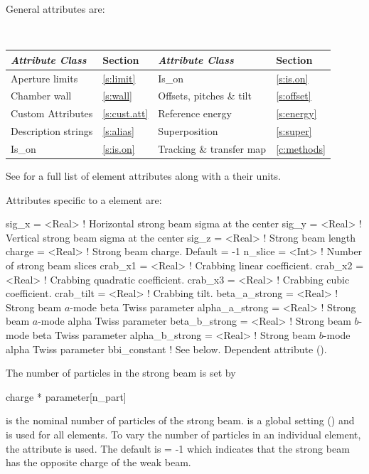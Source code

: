 General  attributes are:
\begin{center} 
\tt
\begin{tabular}{llll} \toprule
  {\sl Attribute Class}      & Section          & {\sl Attribute Class}      & Section         \\ \midrule
  Aperture limits            & \ref{s:limit}    & Is_on                      & \ref{s:is.on}   \\
  Chamber wall               & \ref{s:wall}     & Offsets, pitches \& tilt   & \ref{s:offset}  \\
  Custom Attributes          & \ref{s:cust.att} & Reference energy           & \ref{s:energy}  \\
  Description strings        & \ref{s:alias}    & Superposition              & \ref{s:super}   \\
  Is_on                      & \ref{s:is.on}    & Tracking \& transfer map   & \ref{c:methods} \\ 
  \bottomrule
\end{tabular}
\end{center}
\toffset
See  for a full list of element attributes along with a their units.

Attributes specific to a  element are:
\begin{example}
  sig_x          = <Real> ! Horizontal strong beam sigma at the center 
  sig_y          = <Real> ! Vertical strong beam sigma at the center
  sig_z          = <Real> ! Strong beam length
  charge         = <Real> ! Strong beam charge. Default = -1
  n_slice        = <Int>  ! Number of strong beam slices
  crab_x1        = <Real> ! Crabbing linear coefficient.
  crab_x2        = <Real> ! Crabbing quadratic coefficient.
  crab_x3        = <Real> ! Crabbing cubic coefficient.
  crab_tilt      = <Real> ! Crabbing tilt.
  beta_a_strong  = <Real> ! Strong beam $a$-mode beta Twiss parameter
  alpha_a_strong = <Real> ! Strong beam $a$-mode alpha Twiss parameter 
  beta_b_strong  = <Real> ! Strong beam $b$-mode beta Twiss parameter
  alpha_b_strong = <Real> ! Strong beam $b$-mode alpha Twiss parameter
  bbi_constant            ! See below. Dependent attribute ().
\end{example}

The number of particles in the strong beam is set by
\begin{example}
  charge * parameter[n_part]
\end{example}
 is the nominal number of particles of the strong beam. 
is a global setting () and is used for all  elements.  To vary the number
of particles in an individual  element, the  attribute is used.  The default
is  = -1 which indicates that the strong beam has the opposite charge of the weak beam.

